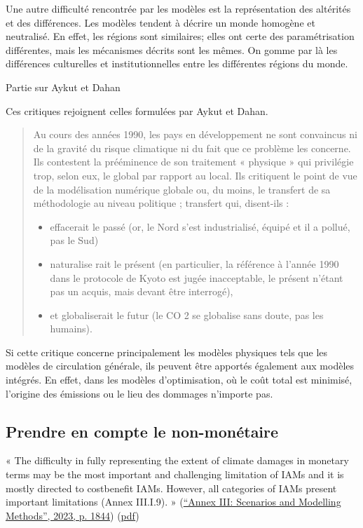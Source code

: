 Une autre difficulté rencontrée par les modèles est la représentation des altérités et des différences. Les modèles tendent à décrire un monde homogène et neutralisé. En effet, les régions sont similaires; elles ont certe des paramétrisation différentes, mais les mécanismes décrits sont les mêmes. On gomme par là les différences culturelles et institutionnelles entre les différentes régions du monde. \\

\begin{tcolorbox}
    Partie sur Aykut et Dahan
\end{tcolorbox}

Ces critiques rejoignent celles formulées par Aykut et Dahan. 

\begin{quote}
    Au cours des années 1990, les pays en développement ne sont convaincus ni de la gravité du risque climatique ni du fait que ce problème les concerne. Ils contestent la prééminence de son traitement « physique » qui privilégie trop, selon eux, le global par rapport au local. Ils critiquent le point de vue de la modélisation numérique globale ou, du moins, le transfert de sa méthodologie au niveau politique ; transfert qui, disent-ils :  
    \begin{itemize}
        \item effacerait le passé (or, le Nord s’est industrialisé, équipé et il a pollué, pas le Sud)
	    \item naturalise rait le présent (en particulier, la référence à l’année 1990 dans le protocole de Kyoto est jugée inacceptable, le présent n’étant pas un acquis, mais devant être interrogé),
	   \item et globaliserait le futur (le CO 2 se globalise sans doute, pas les humains).
    \end{itemize}
\end{quote}

Si cette critique concerne principalement les modèles physiques tels que les modèles de circulation générale, ils peuvent être apportés également aux modèles intégrés. En effet, dans les modèles d'optimisation, où le coût total est minimisé, l'origine des émissions ou le lieu des dommages n'importe pas. 


 \subsection{Prendre en compte le non-monétaire}


« The difficulty in fully representing the extent of climate damages in monetary terms may be the most important and challenging limitation of IAMs and it is mostly directed to costbenefit IAMs. However, all categories of IAMs present important limitations (Annex III.I.9). » (\href{zotero://select/library/items/2SDDNUUF}{“Annex III: Scenarios and Modelling Methods”, 2023, p. 1844}) (\href{zotero://open-pdf/library/items/CHVFSLLH?page=4&annotation=YT933ZM4}{pdf})
 

